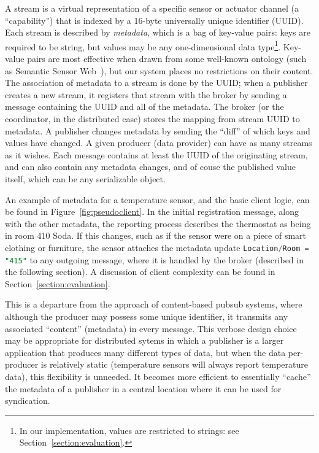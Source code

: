 A stream is a virtual representation of a specific sensor or actuator channel (a ``capability'') that is indexed by a 16-byte universally unique identifier (UUID).
Each stream is described by \emph{metadata}, which is a bag of key-value pairs: keys are required to be string, but values may be any one-dimensional data type\footnote{In our implementation, values are restricted to strings: see Section~\ref{section:evaluation}.}.
Key-value pairs are most effective when drawn from some well-known ontology (such as Semantic Sensor Web~\cite{sheth2008semantic}), but our system places no restrictions on their content.
The association of metadata to a stream is done by the UUID; when a publisher creates a new stream, it registers that stream with the broker by sending a message containing the UUID and all of the metadata.
The broker (or the coordinator, in the distributed case) stores the mapping from stream UUID to metadata.
A publisher changes metadata by sending the ``diff'' of which keys and values have changed.
A given producer (data provider) can have as many streams as it wishes.
Each message contains at least the UUID of the originating stream, and can also contain any metadata changes, and of couse the published value itself, which can be any serializable object.

An example of metadata for a temperature sensor, and the basic client logic, can be found in Figure~\ref{fig:pseudoclient}.
In the initial registration message, along with the other metadata, the reporting process describes the thermostat as being in room 410 Soda.
If this changes, such as if the sensor were on a piece of smart clothing or furniture, the sensor attaches the metadata update \lstinline[language=SQL,basicstyle=\ttfamily]{Location/Room = "415"} to any outgoing message, where it is handled by the broker (described in the following section).
A discussion of client complexity can be found in Section~\ref{section:evaluation}.

This is a departure from the approach of content-based pubsub systems, where although the producer may possess some unique identifier, it transmits any associated ``content'' (metadata) in every message.
This verbose design choice may be appropriate for distributed sytems in which a publisher is a larger application that produces many different types of data, but when the data per-producer is relatively static (temperature sensors will always report temperature data), this flexibility is unneeded.
It becomes more efficient to essentially ``cache'' the metadata of a publisher in a central location where it can be used for syndication.

